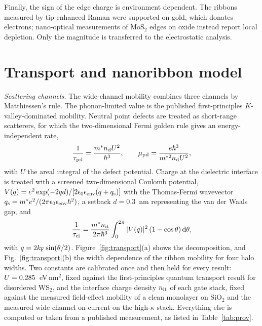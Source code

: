 \documentclass[aip,apl,amsmath,amssymb,reprint,longbibliography]{revtex4-1}
\begin{document}
Finally, the sign of the edge charge is environment dependent. The ribbons
measured by tip-enhanced Raman were supported on gold, which donates
electrons; nano-optical measurements of MoS$_2$ edges on oxide instead report
local depletion.\cite{Su2019,Sousa2024} Only the magnitude is transferred to
the electrostatic analysis.

\section{Transport and nanoribbon model}
\label{sec:transport}

\emph{Scattering channels.} The wide-channel mobility combines three channels
by Matthiessen's rule. The phonon-limited value is the published
first-principles $K$-valley-dominated mobility.\cite{Jin2014} Neutral point
defects are treated as short-range scatterers, for which the
two-dimensional Fermi golden rule gives an energy-independent rate,
\begin{equation}
\frac{1}{\tau_{\rm pd}}=\frac{m^*n_{\rm d}U^2}{\hbar^3},\qquad
\mu_{\rm pd}=\frac{e\hbar^3}{m^{*2}n_{\rm d}U^2},
\end{equation}
with $U$ the areal integral of the defect potential. Charge at the dielectric
interface is treated with a screened two-dimensional Coulomb potential,
$V(q)=e^2\exp(-2qd)/[2\epsilon_0\epsilon_{\rm env}(q+q_{\rm s})]$ with the
Thomas-Fermi wavevector
$q_{\rm s}=m^*e^2/(2\pi\epsilon_0\epsilon_{\rm env}\hbar^2)$, a setback
$d=0.3$~nm representing the van der Waals gap, and
\begin{equation}
\frac{1}{\tau_{\rm ci}}=\frac{m^*n_{\rm it}}{2\pi\hbar^3}
\int_0^{2\pi}|V(q)|^2\left(1-\cos\theta\right)\mathrm{d}\theta ,
\end{equation}
with $q=2k_{\rm F}\sin(\theta/2)$. Figure~\ref{fig:transport}(a) shows the
decomposition, and Fig.~\ref{fig:transport}(b) the width dependence of the ribbon
mobility for four halo widths. Two constants are calibrated once and then held for every
result: $U=0.285$~eV\,nm$^2$, fixed against the first-principles quantum
transport result for disordered WS$_2$,\cite{Dossena2025} and the interface
charge density $n_{\rm it}$ of each gate stack, fixed against the measured
field-effect mobility of a clean monolayer on SiO$_2$ and the measured
wide-channel on-current on the high-$\kappa$ stack. Everything else is
computed or taken from a published measurement, as listed in
Table~\ref{tab:prov}.
\end{document}
